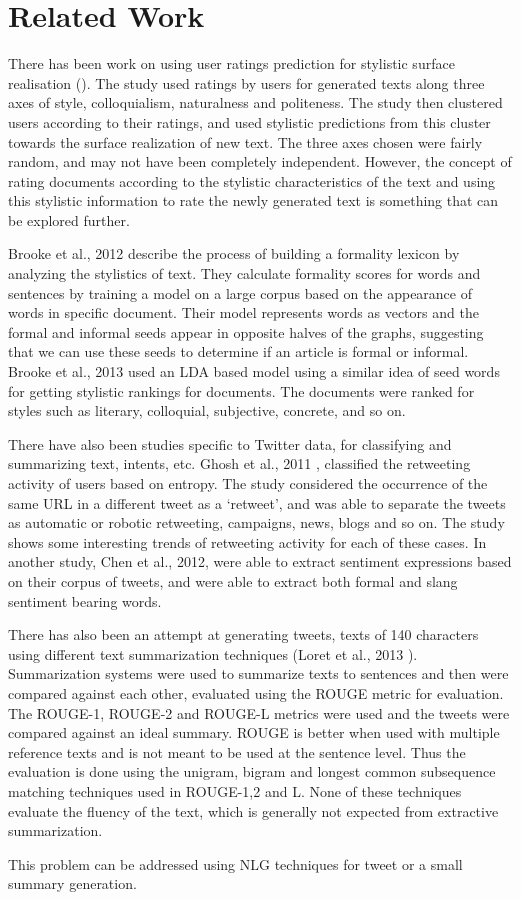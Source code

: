 \chapter{Related Work}

There has been work on using user ratings prediction for stylistic surface realisation (\cite{dethlefs2014cluster}). The study used ratings by users for generated texts along three axes of style, colloquialism, naturalness and politeness. The study then clustered users according to their ratings, and used stylistic predictions from this cluster towards the surface realization of new text. The three axes chosen were fairly random, and may not have been completely independent. However, the concept of rating documents according to the stylistic characteristics of the text and using this stylistic information to rate the newly generated text is something that can be explored further. 

Brooke et al., 2012 \cite{brooke2012building} describe the process of building a formality lexicon by analyzing the stylistics of text. They calculate formality scores for words and sentences by training a model on a large corpus based on the appearance of words in specific document. Their model represents words as vectors and the formal and informal seeds appear in opposite halves of the graphs, suggesting that we can use these seeds to determine if an article is formal or informal. Brooke et al., 2013 \cite{brooke2013multi} used an LDA based model using a similar idea of seed words for getting stylistic rankings for documents. The documents were ranked for styles such as literary, colloquial, subjective, concrete, and so on. 

There have also been studies specific to Twitter data, for classifying and summarizing text, intents, etc. Ghosh et al., 2011 \cite{ghosh2011entropy}, classified the retweeting activity of users based on entropy. The study considered the occurrence of the same URL in a different tweet as a ‘retweet’, and was able to separate the tweets as automatic or robotic retweeting, campaigns, news, blogs and so on. The study shows some interesting trends of retweeting activity for each of these cases. In another study, Chen et al., 2012, were able to extract sentiment expressions based on their corpus of tweets, and were able to extract both formal and slang sentiment bearing words. 

There has also been an attempt at generating tweets, texts of 140 characters using different text summarization techniques (Loret et al., 2013 \cite{lloret2013towards}). Summarization systems were used to summarize texts to sentences and then were compared against each other, evaluated using the ROUGE metric for evaluation. The ROUGE-1, ROUGE-2 and ROUGE-L metrics were used and the tweets were compared against an ideal summary. ROUGE is better when used with multiple reference texts and is not meant to be used at the sentence level. Thus the evaluation is done using the unigram, bigram and longest common subsequence matching techniques used in ROUGE-1,2 and L. None of these techniques evaluate the fluency of the text, which is generally not expected from extractive summarization. 

This problem can be addressed using NLG techniques for tweet or a small summary generation.
